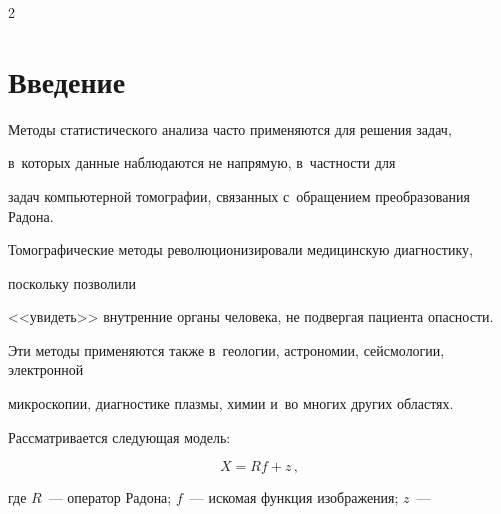 \vspace*{-6pt}


















\thispagestyle{headings}





\begin{multicols}{2}





\label{st\stat}





\section{Введение}





Методы статистического анализа часто применяются для решения задач,


в~которых данные наблюдаются не напрямую, в~частности для


задач компьютерной томографии, связанных с~обращением преобразования Радона.


Томографические методы революционизировали медицинскую диагностику,


поскольку позволили


<<увидеть>> внутренние органы человека, не подвергая пациента опасности.


Эти методы применяются также в~геологии, астрономии, сейсмологии, электронной


микроскопии, диагностике плазмы, химии и~во многих других областях.


Рассматривается следующая модель:


\begin{equation*}


X = R f + z\,,


\end{equation*}


где $R$~--- оператор Радона; $f$~--- искомая функция изображения; $z$~---



\end{multicols}
